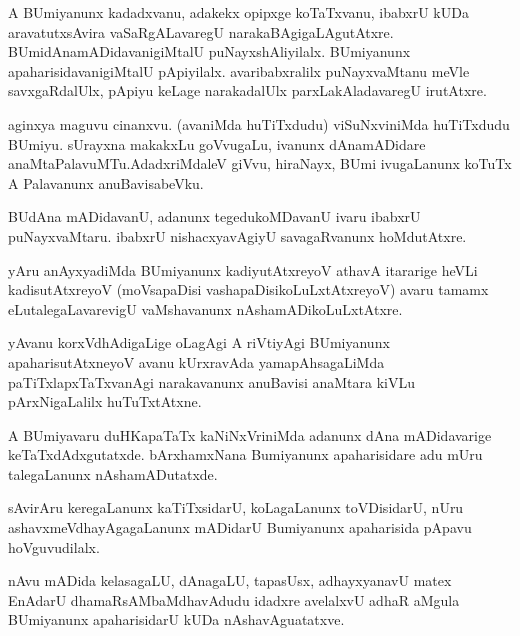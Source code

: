 \documentclass{article}
\begin{document}
\begin{mn}%
A BUmiyanunx kadadxvanu, adakekx opipxge koTaTxvanu, ibabxrU kUDa aravatutxsAvira vaSaRgALavaregU 
narakaBAgigaLAgutAtxre. BUmidAnamADidavanigiMtalU puNayxshAliyilalx. BUmiyanunx 
apaharisidavanigiMtalU pApiyilalx. avaribabxralilx puNayxvaMtanu meVle savxgaRdalUlx, pApiyu 
keLage narakadalUlx parxLakAladavaregU irutAtxre.
\end{mn}

\begin{mn}%
aginxya maguvu cinanxvu. (avaniMda huTiTxdudu) viSuNxviniMda huTiTxdudu BUmiyu. sUrayxna makakxLu 
goVvugaLu, ivanunx dAnamADidare anaMtaPalavuMTu.AdadxriMdaleV giVvu, hiraNayx, BUmi ivugaLanunx 
koTuTx A Palavanunx anuBavisabeVku.
\end{mn}

\begin{mn}%
BUdAna mADidavanU, adanunx tegedukoMDavanU ivaru ibabxrU puNayxvaMtaru. ibabxrU nishacxyavAgiyU 
savagaRvanunx hoMdutAtxre.
\end{mn}

\begin{mn}%
yAru anAyxyadiMda BUmiyanunx kadiyutAtxreyoV athavA itararige heVLi kadisutAtxreyoV (moVsapaDisi 
vashapaDisikoLuLxtAtxreyoV) avaru tamamx eLutalegaLavarevigU vaMshavanunx nAshamADikoLuLxtAtxre.
\end{mn}

\begin{mn}%
yAvanu korxVdhAdigaLige oLagAgi A riVtiyAgi BUmiyanunx apaharisutAtxneyoV avanu kUrxravAda 
yamapAhsagaLiMda paTiTxlapxTaTxvanAgi narakavanunx anuBavisi anaMtara kiVLu pArxNigaLalilx 
huTuTxtAtxne.
\end{mn}

\begin{mn}%
A BUmiyavaru duHKapaTaTx kaNiNxVriniMda adanunx dAna mADidavarige keTaTxdAdxgutatxde. bArxhamxNana 
Bumiyanunx apaharisidare adu mUru talegaLanunx nAshamADutatxde.
\end{mn}

\begin{mn}%
sAvirAru keregaLanunx kaTiTxsidarU, koLagaLanunx toVDisidarU, nUru ashavxmeVdhayAgagaLanunx 
mADidarU Bumiyanunx apaharisida  pApavu hoVguvudilalx.
\end{mn}

\begin{mn}%
nAvu mADida kelasagaLU, dAnagaLU, tapasUsx, adhayxyanavU matex EnAdarU dhamaRsAMbaMdhavAdudu 
idadxre avelalxvU adhaR aMgula BUmiyanunx apaharisidarU kUDa nAshavAguatatxve.
\end{mn}
\end{document}
